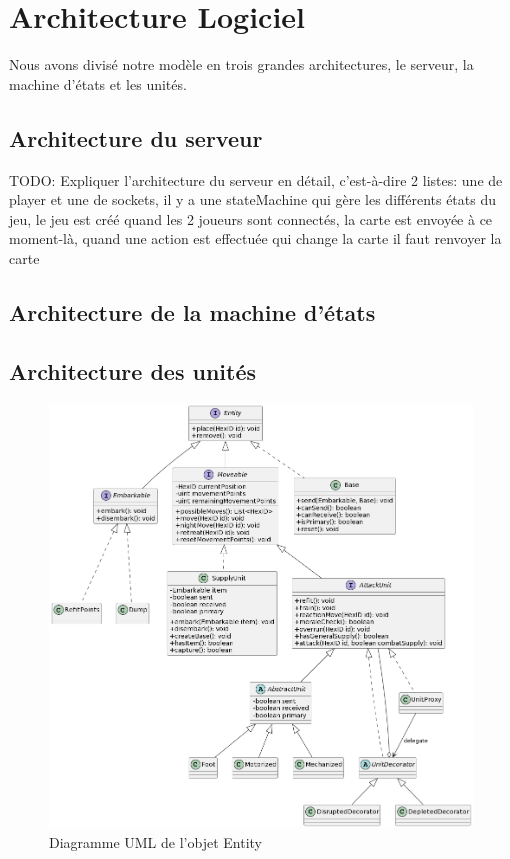 
\section{Architecture Logiciel}

Nous avons divisé notre modèle en trois grandes architectures, le serveur, la machine d'états et les unités.

\subsection{Architecture du serveur}

TODO: Expliquer l'architecture du serveur en détail, c'est-à-dire 2 listes: une de player et une de sockets, il y a une stateMachine qui gère les différents états du jeu,
le jeu est créé quand les 2 joueurs sont connectés, la carte est envoyée à  ce moment-là, quand une action est effectuée qui change la carte il faut renvoyer la carte

\subsection{Architecture de la machine d'états}



\subsection{Architecture des unités}

\begin{figure}[H]
    \centering
    \includegraphics[scale=0.3]{data/uml_entityV4.png}
    \caption{Diagramme UML de l'objet Entity}
    \label{fig:uml_entity}
\end{figure}

